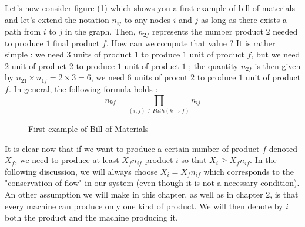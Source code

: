 Let's now consider figure (\ref{without_st:first_example}) which shows you a first example of bill of materials and let's extend the notation $n_{ij}$ to any nodes $i$ and $j$ as long as there exists a path from $i$ to $j$ in the graph. Then, $n_{2f}$ represents the number product $2$ needed to produce $1$ final product $f$. How can we compute that value ? It is rather simple : we need $3$ units of product $1$ to produce $1$ unit of product $f$, but we need $2$ unit of product $2$ to produce $1$ unit of product $1$ ; the quantity $n_{2f}$ is then given by $n_{21}\times n_{1f} = 2 \times 3 = 6$, we need $6$ units of procut $2$ to produce $1$ unit of product $f$. In general, the following formula holds : \[ n_{kf} = \prod_{ (i,j)\in Path(k\rightarrow f) } n_{ij} \]

\begin{figure}[h!]
    \centering
    \caption{\label{without_st:first_example}First example of Bill of Materials}
\end{figure}

It is clear now that if we want to produce a certain number of product $f$ denoted $X_f$, we need to produce at least $X_fn_{if}$ product $i$ so that $X_i\ge X_fn_{if}$. In the following discussion, we will always choose $X_i = X_fn_{if}$ which corresponds to the "conservation of flow" in our system (even though it is not a necessary condition). An other assumption we will make in this chapter, as well as in chapter 2, is that every machine can produce only one kind of product. We will then denote by $i$ both the product and the machine producing it. 

